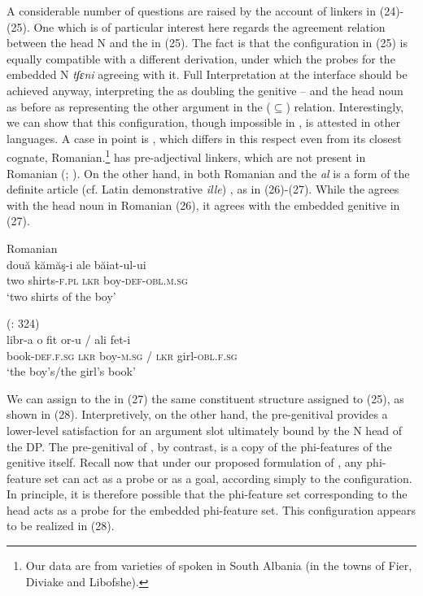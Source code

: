 \documentclass[output=paper]{langsci/langscibook}
\begin{document}
A considerable number of questions are raised by the account of linkers in (24)-(25). One which is of particular interest here regards the agreement relation between the head N and the  in (25). The fact is that the configuration in (25) is equally compatible with a different derivation, under which the  probes for the embedded N \textit{tʃɛni} agreeing with it. Full Interpretation at the interface should be achieved anyway, interpreting the  as doubling the genitive – and the head noun as before as representing the other argument in the ($\subseteq$) relation. Interestingly, we can show that this configuration, though impossible in , is attested in other languages. A case in point is , which differs in this respect even from its closest cognate, Romanian.\footnote{Our data are from varieties of  spoken in South Albania (in the towns of Fier, Diviake and Libofshe).}  has pre-ad\-jec\-ti\-val linkers, which are not present in Romanian (\citealt{Campos2008}; \citealt{Cornilescu2013}). On the other hand, in both Romanian and  the  \textit{al} is a form of the definite article (cf. Latin demonstrative \textit{ille}) \citep{Giurgea2012}, as in (26)-(27). While the  agrees with the head noun in Romanian (26), it agrees with the embedded genitive in  (27).

\ea%
         Romanian\label{ex:manzini:26}\\
    \gll două   kămăş-i   ale   băiat-ul-ui     \\
         two   shirts-\textsc{f.pl}  \textsc{lkr}  boy-\textsc{def-obl.m.sg}   \\
    \glt ‘two shirts of the boy’ 
    \z


\ea%
          (\citealt{Franco2015}: 324) \label{ex:manzini:27}\\
    \gll libr-a       o   {fit or-u} /  ali   fet-i     \\
         book-\textsc{def.f.sg}   \textsc{lkr}  boy\textsc{{}-m.sg} /   \textsc{lkr}  girl-\textsc{obl.f.sg}   \\
    \glt ‘the boy’s/the girl’s book’
    \z


We can assign to the   in (27) the same constituent structure assigned to  (25), as shown in (28). Interpretively, on the other hand, the  pre-genitival  provides a lower-level satisfaction for an argument slot ultimately bound by the N head of the DP. The pre-genitival  of , by contrast, is a copy of the phi-features of the genitive itself. Recall now that under our proposed formulation of , any phi-feature set can act as a probe or as a goal, according simply to the  configuration. In principle, it is therefore possible that the phi-feature set corresponding to the  head acts as a probe for the embedded phi-feature set. This configuration appears to be realized in  (28).
\end{document}

